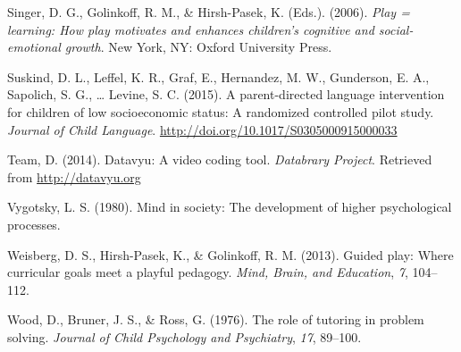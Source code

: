 \documentclass[10pt, letterpaper]{article}
\begin{document}
\hypertarget{ref-Singer2006}{}
Singer, D. G., Golinkoff, R. M., \& Hirsh-Pasek, K. (Eds.). (2006).
\emph{Play = learning: How play motivates and enhances children's
cognitive and social-emotional growth}. New York, NY: Oxford University
Press.

\hypertarget{ref-Suskind2015}{}
Suskind, D. L., Leffel, K. R., Graf, E., Hernandez, M. W., Gunderson, E.
A., Sapolich, S. G., \ldots{} Levine, S. C. (2015). A parent-directed
language intervention for children of low socioeconomic status: A
randomized controlled pilot study. \emph{Journal of Child Language}.
\url{http://doi.org/10.1017/S0305000915000033}

\hypertarget{ref-datavyu}{}
Team, D. (2014). Datavyu: A video coding tool. \emph{Databrary Project}.
Retrieved from \url{http://datavyu.org}

\hypertarget{ref-Vygotsky1980}{}
Vygotsky, L. S. (1980). Mind in society: The development of higher
psychological processes.

\hypertarget{ref-Weisberg2013}{}
Weisberg, D. S., Hirsh-Pasek, K., \& Golinkoff, R. M. (2013). Guided
play: Where curricular goals meet a playful pedagogy. \emph{Mind, Brain,
and Education}, \emph{7}, 104--112.

\hypertarget{ref-Wood1976}{}
Wood, D., Bruner, J. S., \& Ross, G. (1976). The role of tutoring in
problem solving. \emph{Journal of Child Psychology and Psychiatry},
\emph{17}, 89--100.


\end{document}
